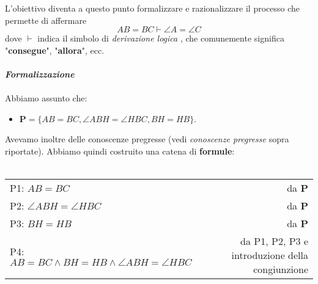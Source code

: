 \documentclass[11pt]{article}
\begin{document}
L'obiettivo diventa a questo punto formalizzare e razionalizzare il processo che permette di affermare $$ AB=BC\vdash\angle A = \angle C$$ dove $\vdash$ indica il simbolo di \color{red} \textit{derivazione logica} \color{black}, che comunemente significa "\textbf{consegue}", "\textbf{allora}", ecc.
\\ \\
\textit{\textbf{Formalizzazione}}
\\ \\
Abbiamo assunto che:
\begin{itemize}
\item $\textbf{P} = \{AB=BC, \angle ABH = \angle HBC, BH = HB\}$.
\end{itemize}
Avevamo inoltre delle conoscenze pregresse (vedi \textit{conoscenze pregresse} sopra riportate).
Abbiamo quindi costruito una catena di \textbf{formule}:
\\ \\
\begin{tabular}{p{}r}
	P1: $AB=BC$ & da \textbf{P} \\
	P2: $\angle ABH = \angle HBC$ & da \textbf{P} \\
	P3: $BH = HB$ & da \textbf{P} \\
	P4: $AB = BC \wedge BH = HB \wedge \angle ABH = \angle HBC$ & da P1, P2, P3 e \color{red} introduzione della congiunzione \color{black} \\
\end{tabular}
\end{document}
